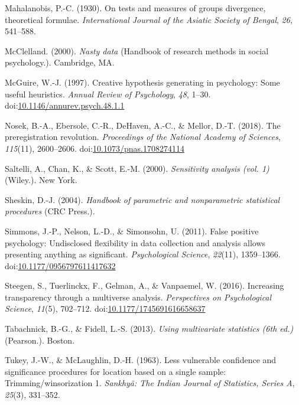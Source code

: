 \documentclass[man,floatsintext]{apa6}
\begin{document}
\hypertarget{ref-Mahalanobis_1930}{}
Mahalanobis, P.-C. (1930). On tests and measures of groups divergence,
theoretical formulae. \emph{International Journal of the Asiatic Society
of Bengal}, \emph{26}, 541--588.

\hypertarget{ref-McClelland_2000}{}
McClelland. (2000). \emph{Nasty data} (Handbook of research methods in
social psychology.). Cambridge, MA.

\hypertarget{ref-McGuire_1997}{}
McGuire, W.-J. (1997). Creative hypothesis generating in psychology:
Some useful heuristics. \emph{Annual Review of Psychology}, \emph{48},
1--30.
doi:\href{https://doi.org/10.1146/annurev.psych.48.1.1}{10.1146/annurev.psych.48.1.1}

\hypertarget{ref-Nosek_et_al_2018}{}
Nosek, B.-A., Ebersole, C.-R., DeHaven, A.-C., \& Mellor, D.-T. (2018).
The preregistration revolution. \emph{Proceedings of the National
Academy of Sciences}, \emph{115}(11), 2600--2606.
doi:\href{https://doi.org/10.1073/pnas.1708274114}{10.1073/pnas.1708274114}

\hypertarget{ref-Saltelli_et_al_2000}{}
Saltelli, A., Chan, K., \& Scott, E.-M. (2000). \emph{Sensitivity
analysis (vol. 1)} (Wiley.). New York.

\hypertarget{ref-Sheskin_2004}{}
Sheskin, D.-J. (2004). \emph{Handbook of parametric and nonparametric
statistical procedures} (CRC Press.).

\hypertarget{ref-Simmons_et_al_2011}{}
Simmons, J.-P., Nelson, L.-D., \& Simonsohn, U. (2011). False positive
psychology: Undisclosed flexibility in data collection and analysis
allows presenting anything as significant. \emph{Psychological Science},
\emph{22}(11), 1359--1366.
doi:\href{https://doi.org/10.1177/0956797611417632}{10.1177/0956797611417632}

\hypertarget{ref-Steegen_et_al_2016}{}
Steegen, S., Tuerlinckx, F., Gelman, A., \& Vanpaemel, W. (2016).
Increasing transparency through a multiverse analysis.
\emph{Perspectives on Psychological Science}, \emph{11}(5), 702--712.
doi:\href{https://doi.org/10.1177/1745691616658637}{10.1177/1745691616658637}

\hypertarget{ref-Tabachnick_Fidell_2013}{}
Tabachnick, B.-G., \& Fidell, L.-S. (2013). \emph{Using multivariate
statistics (6th ed.)} (Pearson.). Boston.

\hypertarget{ref-Tukey_and_McLaughlin_1963}{}
Tukey, J.-W., \& McLaughlin, D.-H. (1963). Less vulnerable confidence
and significance procedures for location based on a single sample:
Trimming/winsorization 1. \emph{Sankhyã: The Indian Journal of
Statistics, Series A}, \emph{25}(3), 331--352.
\end{document}
